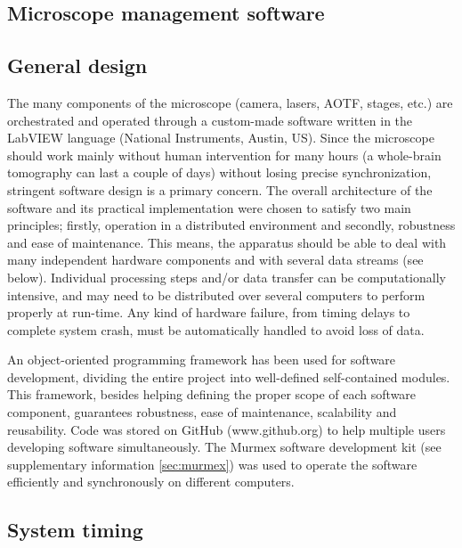 \documentclass[12pt]{spieman}  %
\begin{document}
\begin{spacing}{2}
\section{Microscope management software}

\subsection{General design}
The many components of the microscope (camera, lasers, AOTF, stages, etc.) are orchestrated and operated through a custom-made software written in the LabVIEW language (National Instruments, Austin, US). Since the microscope should work mainly without human intervention for many hours (a whole-brain tomography can last a couple of days) without losing precise synchronization, stringent software design is a primary concern. The overall architecture of the software and its practical implementation were chosen to satisfy two main principles; firstly, operation in a distributed environment and secondly, robustness and ease of maintenance. This means, the apparatus should be able to deal with many independent hardware components and with several data streams (see below). Individual processing steps and/or data transfer can be computationally intensive, and may need to be distributed over several computers to perform properly at run-time. Any kind of hardware failure, from timing delays to complete system crash, must be automatically handled to avoid loss of data.

An object-oriented programming framework \cite{castagna1997object} has been used for software development, dividing the entire project into well-defined self-contained modules. This framework, besides helping defining the proper scope of each software component, guarantees robustness, ease of maintenance, scalability and reusability. Code was stored on GitHub (www.github.org) to help multiple users developing software simultaneously. The Murmex software development kit (see supplementary information \ref{sec:murmex}) was used to operate the software efficiently and synchronously on different computers.



\subsection{System timing}
\label{sec:timing}


\end{spacing}
\end{document}
